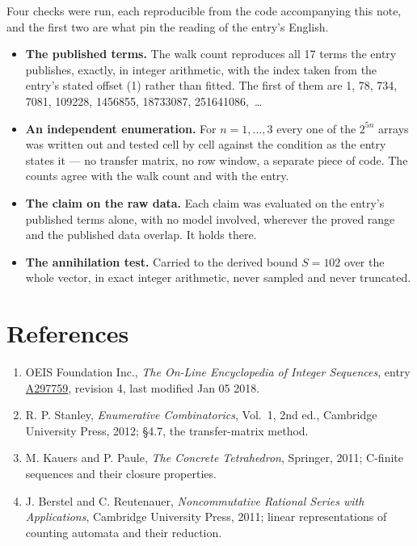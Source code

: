 \documentclass[11pt]{article}
\theoremstyle{definition}
\begin{document}
Four checks were run, each reproducible from the code accompanying this note, and the first two are what pin the reading of the entry's English.

\begin{itemize}

\item {\bfseries The published terms.} The walk count reproduces all 17 terms the entry publishes, exactly, in integer arithmetic, with the index taken from the entry's stated offset (1) rather than fitted. The first of them are 1, 78, 734, 7081, 109228, 1456855, 18733087, 251641086,~\dots

\item {\bfseries An independent enumeration.} For $n = 1,\dots,3$ every one of the $2^{5n}$ arrays was written out and tested cell by cell against the condition as the entry states it --- no transfer matrix, no row window, a separate piece of code. The counts agree with the walk count and with the entry.

\item {\bfseries The claim on the raw data.} Each claim was evaluated on the entry's published terms alone, with no model involved, wherever the proved range and the published data overlap. It holds there.

\item {\bfseries The annihilation test.} Carried to the derived bound $S = 102$ over the whole vector, in exact integer arithmetic, never sampled and never truncated.

\end{itemize}

\section{References}

\begin{enumerate}

\item OEIS Foundation Inc., \emph{The On-Line Encyclopedia of Integer Sequences}, entry \href{https://oeis.org/A297759}{A297759}, revision 4, last modified Jan 05 2018.

\item R. P. Stanley, \emph{Enumerative Combinatorics}, Vol.~1, 2nd ed., Cambridge University Press, 2012; \S4.7, the transfer-matrix method.

\item M. Kauers and P. Paule, \emph{The Concrete Tetrahedron}, Springer, 2011; C-finite sequences and their closure properties.

\item J. Berstel and C. Reutenauer, \emph{Noncommutative Rational Series with Applications}, Cambridge University Press, 2011; linear representations of counting automata and their reduction.

\end{enumerate}
\end{document}
